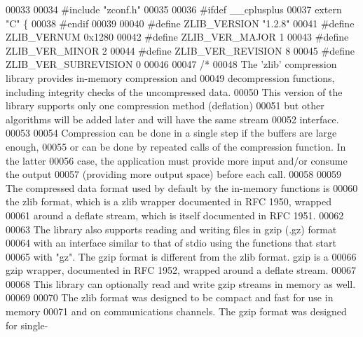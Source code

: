 \begin{DoxyCode}
00033 
00034 \textcolor{preprocessor}{#include "zconf.h"}
00035 
00036 \textcolor{preprocessor}{#ifdef \_\_cplusplus}
00037 \textcolor{keyword}{extern} \textcolor{stringliteral}{"C"} \{
00038 \textcolor{preprocessor}{#endif}
00039 
00040 \textcolor{preprocessor}{#define ZLIB\_VERSION "1.2.8"}
00041 \textcolor{preprocessor}{#define ZLIB\_VERNUM 0x1280}
00042 \textcolor{preprocessor}{#define ZLIB\_VER\_MAJOR 1}
00043 \textcolor{preprocessor}{#define ZLIB\_VER\_MINOR 2}
00044 \textcolor{preprocessor}{#define ZLIB\_VER\_REVISION 8}
00045 \textcolor{preprocessor}{#define ZLIB\_VER\_SUBREVISION 0}
00046 
00047 \textcolor{comment}{/*}
00048 \textcolor{comment}{    The 'zlib' compression library provides in-memory compression and}
00049 \textcolor{comment}{  decompression functions, including integrity checks of the uncompressed data.}
00050 \textcolor{comment}{  This version of the library supports only one compression method (deflation)}
00051 \textcolor{comment}{  but other algorithms will be added later and will have the same stream}
00052 \textcolor{comment}{  interface.}
00053 \textcolor{comment}{}
00054 \textcolor{comment}{    Compression can be done in a single step if the buffers are large enough,}
00055 \textcolor{comment}{  or can be done by repeated calls of the compression function.  In the latter}
00056 \textcolor{comment}{  case, the application must provide more input and/or consume the output}
00057 \textcolor{comment}{  (providing more output space) before each call.}
00058 \textcolor{comment}{}
00059 \textcolor{comment}{    The compressed data format used by default by the in-memory functions is}
00060 \textcolor{comment}{  the zlib format, which is a zlib wrapper documented in RFC 1950, wrapped}
00061 \textcolor{comment}{  around a deflate stream, which is itself documented in RFC 1951.}
00062 \textcolor{comment}{}
00063 \textcolor{comment}{    The library also supports reading and writing files in gzip (.gz) format}
00064 \textcolor{comment}{  with an interface similar to that of stdio using the functions that start}
00065 \textcolor{comment}{  with "gz".  The gzip format is different from the zlib format.  gzip is a}
00066 \textcolor{comment}{  gzip wrapper, documented in RFC 1952, wrapped around a deflate stream.}
00067 \textcolor{comment}{}
00068 \textcolor{comment}{    This library can optionally read and write gzip streams in memory as well.}
00069 \textcolor{comment}{}
00070 \textcolor{comment}{    The zlib format was designed to be compact and fast for use in memory}
00071 \textcolor{comment}{  and on communications channels.  The gzip format was designed for single-}

\end{DoxyCode}
